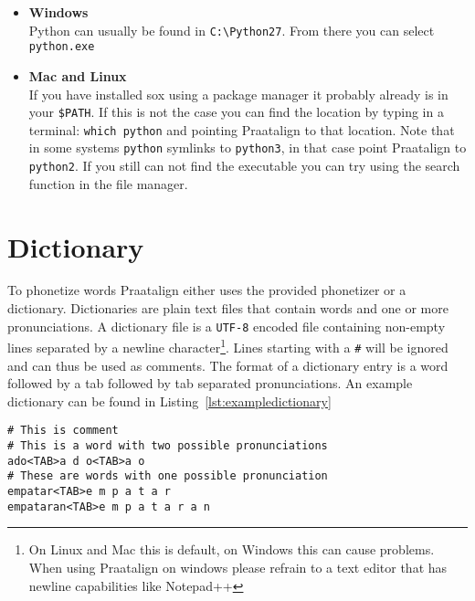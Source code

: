 \begin{itemize}
\begin{itemize}
				\begin{itemize}
					\item \textbf{Windows}\\
						Python can usually be found in \texttt{C:\textbackslash Python27}.
						From there you can select \texttt{python.exe}
					\item \textbf{Mac and Linux}\\
						If you have installed sox using a package manager it probably
						already is in your \texttt{\$PATH}. If this is not the case you can
						find the location by typing in a terminal: \texttt{which python}
						and pointing Praatalign to that location. Note that in some systems
						\texttt{python} symlinks to \texttt{python3}, in that case point
						Praatalign to \texttt{python2}. If you still can not find the
						executable you can try using the search function in the file
						manager.
				\end{itemize}
		\end{itemize}
\end{itemize}

\section{Dictionary}
To phonetize words Praatalign either uses the provided phonetizer or a
dictionary. Dictionaries are plain text files that contain words and one or
more pronunciations. A dictionary file is a \texttt{UTF-8} encoded file
containing non-empty lines separated by a newline
character\footnote{\label{fn:n1}On Linux and Mac this is default, on Windows
this can cause problems. When using Praatalign on windows please refrain to a
text editor that has newline capabilities like Notepad++}. Lines starting with
a \texttt{\#} will be ignored and can thus be used as comments. The format of a
dictionary entry is a word followed by a tab followed by tab separated
pronunciations. An example dictionary can be found in
Listing~\ref{lst:exampledictionary}

\begin{lstlisting}[caption={Example dictionary},label={lst:exampledictionary}]
# This is comment
# This is a word with two possible pronunciations
ado<TAB>a d o<TAB>a o
# These are words with one possible pronunciation
empatar<TAB>e m p a t a r
empataran<TAB>e m p a t a r a n
\end{lstlisting}
	
